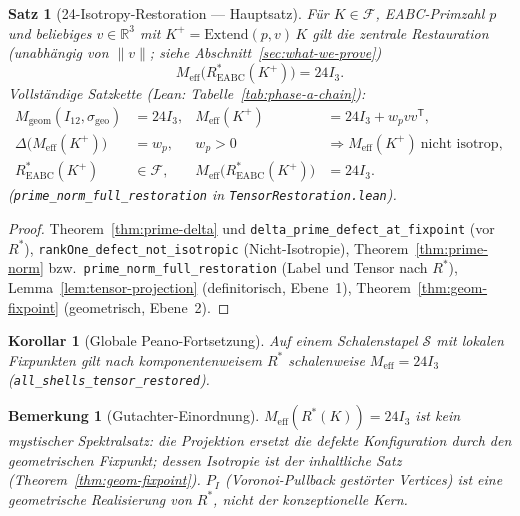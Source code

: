 \documentclass[11pt,a4paper]{article}
\newtheorem{theorem}{Satz}
\newtheorem{remark}{Bemerkung}
\newtheorem{corollary}{Korollar}
\begin{document}
	\begin{theorem}[24-Isotropy-Restoration --- Hauptsatz]
		\label{thm:tensor-restore}
		Für $K\in\mathcal{F}$, EABC-Primzahl $p$ und beliebiges $v\in\mathbb{R}^3$ mit
		$K^+=\mathrm{Extend}(p,v)\,K$ gilt die zentrale Restauration
		(unabhängig von $\|v\|$; siehe Abschnitt~\ref{sec:what-we-prove})
		\[
		\boxed{
			M_{\mathrm{eff}}\bigl(R^*_{\mathrm{EABC}}(K^+)\bigr) = 24I_3
		}.
		\]
		Vollständige Satzkette (Lean: Tabelle~\ref{tab:phase-a-chain}):
		\begin{align*}
			M_{\mathrm{geom}}(I_{12},\sigma_{\mathrm{geo}}) &= 24I_3,
			&
			M_{\mathrm{eff}}(K^+) &= 24I_3+w_pvv^{\mathsf T},
			\\
			\Delta\bigl(M_{\mathrm{eff}}(K^+)\bigr) &= w_p,
			&
			w_p>0 &\Rightarrow M_{\mathrm{eff}}(K^+)\ \text{nicht isotrop},
			\\
			R^*_{\mathrm{EABC}}(K^+) &\in \mathcal{F},
			&
			M_{\mathrm{eff}}\bigl(R^*_{\mathrm{EABC}}(K^+)\bigr) &= 24I_3.
		\end{align*}
		(\texttt{prime\_norm\_full\_restoration} in \texttt{TensorRestoration.lean}).
	\end{theorem}
	
	\begin{proof}
		Theorem~\ref{thm:prime-delta} und \texttt{delta\_prime\_defect\_at\_fixpoint}
		(vor $R^*$),
		\texttt{rankOne\_defect\_not\_isotropic} (Nicht-Isotropie),
		Theorem~\ref{thm:prime-norm} bzw.\ \texttt{prime\_norm\_full\_restoration}
		(Label und Tensor nach $R^*$),
		Lemma~\ref{lem:tensor-projection} (definitorisch, Ebene~1),
		Theorem~\ref{thm:geom-fixpoint} (geometrisch, Ebene~2).
	\end{proof}
	
	\begin{corollary}[Globale Peano-Fortsetzung]
		\label{cor:shellstack-global}
		Auf einem Schalenstapel $\mathcal{S}$ mit lokalen Fixpunkten gilt nach komponentenweisem
		$R^*$ schalenweise $M_{\mathrm{eff}}=24I_3$
		(\texttt{all\_shells\_tensor\_restored}).
	\end{corollary}
	
	\begin{remark}[Gutachter-Einordnung]
		$M_{\mathrm{eff}}(R^*(K))=24I_3$ ist \emph{kein} mystischer Spektralsatz:
		die Projektion ersetzt die defekte Konfiguration durch den geometrischen Fixpunkt;
		dessen Isotropie ist der inhaltliche Satz (Theorem~\ref{thm:geom-fixpoint}).
		$P_I$ (Voronoi-Pullback gestörter Vertices) ist eine geometrische Realisierung
		von $R^*$, nicht der konzeptionelle Kern.
	\end{remark}
	
\end{document}
